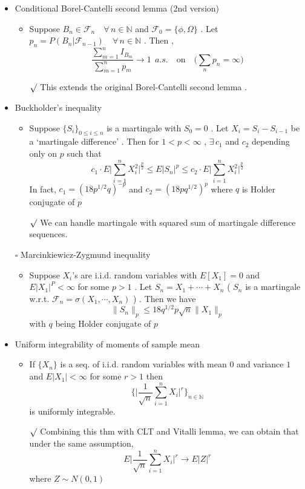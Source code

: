 \documentclass[12pt, A4]{article}
\newcommand{\sq}{$\square$}
\newcommand{\rmk}{$\surd$}
\newcommand{\N}{\mathbb{N}}
\newcommand{\F}{\mathcal{F}}
\newcommand{\exist}{\exists\,}
\newcommand{\foranyn}{\quad \forall \, n\in \N}
\begin{document}
\begin{itemize}
\begin{itemize}
\begin{enumerate}
\begin{itemize}
			\end{itemize}
		\end{enumerate}
	\end{itemize}
	\item Conditional Borel-Cantelli second lemma (2nd version)
	\begin{itemize}
		\item Suppose $B_n\in \F_n\foranyn$ and $\F_0=\{\phi, \Omega\}$ . Let $p_n=P(B_n|\F_{n-1})\foranyn$ . Then , $$ \frac{\sum_{m=1}^n I_{B_m}}{\sum_{m=1}^n p_m}\rightarrow 1 \;\,a.s. \quad \text{on}\quad \big(\sum_n p_n=\infty \big) $$
		\item[\rmk] This extends the original Borel-Cantelli second lemma . 
	\end{itemize}
\clearpage

	\item Buckholder's inequality
	\begin{itemize}
		\item Suppose $\{S_i\}_{0\leq i \leq n}$ is a martingale with $S_0=0$ . Let $X_i = S_i - S_{i-1}$ be a `martingale difference' . Then for $1<p<\infty$ , $\exist c_1$ and $c_2$ depending only on $p$ such that
		$$c_1\cdot E\big|\sum_{i=1}^n X_i^2 \big|^{\frac{p}{2}}\leq E|S_n|^p\leq c_2\cdot E\big|\sum_{i=1}^n X_i^2 \big|^{\frac{p}{2}}$$
		In fact, $c_1 = (18 p^{1/2}q)^{-p}$ and $c_2 = (18pq^{1/2})^p$ where $q$ is Holder conjugate of $p$
		\item[\rmk] We can handle martingale with squared sum of martingale difference sequences.
	\end{itemize}
	\item[\sq] Marcinkiewicz-Zygmund inequality
	\begin{itemize}
		\item Suppose $X_i$'s are i.i.d. random variables with $E[X_1]=0$ and $E|X_1|^P<\infty$ for some $p>1$ . Let $S_n=X_1+\cdots +X_n$ ( $S_n$ is a martingale w.r.t. $\F_n=\sigma(X_1, \cdots, X_n)$ ) . Then we have $$\|S_n\|_p\leq 18q^{1/2}p\sqrt{n}\|X_1\|_p $$ with $q$ being Holder conjugate of $p$
	\end{itemize}
	\item Uniform integrability of moments of sample mean
	\begin{itemize}
		\item If $\{X_n\}$ is a seq. of i.i.d. random variables with mean $0$ and variance $1$ and $E|X_1|<\infty$ for some $r>1$ then $$\bigg\{\bigg|\frac{1}{\sqrt{n}}\sum_{i=1}^n X_i \bigg|^r  \bigg\}_{n\in \N} $$ is uniformly integrable.
		\item[\rmk] Combining this thm with CLT and Vitalli lemma, we can obtain that under the same assumption, $$E\bigg|\frac{1}{\sqrt{n}}\sum_{i=1}^n X_i \bigg|^r\rightarrow E|Z|^r $$ where $Z\sim N(0,1)$
	\end{itemize} 

\end{itemize}
\end{document}
